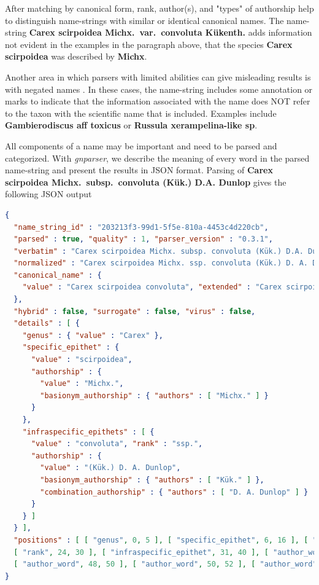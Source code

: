 \documentclass{bmcart}
\begin{document}
After matching by canonical form, rank, author(s), and "types" of authorship help to distinguish name-strings with similar or identical canonical names. The name-string \textbf{Carex scirpoidea Michx.\ var.\ convoluta Kükenth.} adds  information not evident in the examples in the paragraph above, that the species \textbf{Carex scirpoidea} was described by \textbf{Michx}.

Another area in which parsers with limited abilities can give misleading results is with negated names \cite{Patterson2016}. In these cases, the name-string includes some annotation or marks to indicate that the information associated with the name does NOT refer to the taxon with the scientific name that is included. Examples include \textbf{Gambierodiscus aff toxicus} or \textbf{Russula xerampelina-like sp}.

All components of a name may be important and need to be parsed and categorized. With \textit{gnparser}, we describe the meaning of every word in the parsed name-string and present the results in JSON format. Parsing of \textbf{Carex scirpoidea Michx.\ subsp.\ convoluta (Kük.) D.A. Dunlop} gives the following JSON output

\vspace{0.1cm}

\begin{lstlisting}[language=json]
{
  "name_string_id" : "203213f3-99d1-5f5e-810a-4453c4d220cb",
  "parsed" : true, "quality" : 1, "parser_version" : "0.3.1",
  "verbatim" : "Carex scirpoidea Michx. subsp. convoluta (Kük.) D.A. Dunlop",
  "normalized" : "Carex scirpoidea Michx. ssp. convoluta (Kük.) D. A. Dunlop",
  "canonical_name" : {
    "value" : "Carex scirpoidea convoluta", "extended" : "Carex scirpoidea ssp. convoluta"
  },
  "hybrid" : false, "surrogate" : false, "virus" : false,
  "details" : [ {
    "genus" : { "value" : "Carex" },
    "specific_epithet" : {
      "value" : "scirpoidea",
      "authorship" : {
        "value" : "Michx.",
        "basionym_authorship" : { "authors" : [ "Michx." ] }
      }
    },
    "infraspecific_epithets" : [ {
      "value" : "convoluta", "rank" : "ssp.",
      "authorship" : {
        "value" : "(Kük.) D. A. Dunlop",
        "basionym_authorship" : { "authors" : [ "Kük." ] },
        "combination_authorship" : { "authors" : [ "D. A. Dunlop" ] }
      }
    } ]
  } ],
  "positions" : [ [ "genus", 0, 5 ], [ "specific_epithet", 6, 16 ], [ "author_word", 17, 23 ],
  [ "rank", 24, 30 ], [ "infraspecific_epithet", 31, 40 ], [ "author_word", 42, 46 ],
  [ "author_word", 48, 50 ], [ "author_word", 50, 52 ], [ "author_word", 53, 59 ] ]
}
\end{lstlisting}
\end{document}
